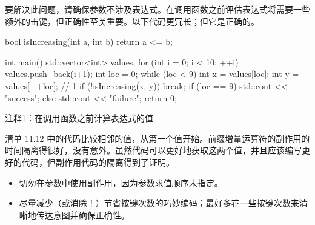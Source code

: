 要解决此问题，请确保参数不涉及表达式。在调用函数之前评估表达式将需要一些额外的击键，但正确性至关重要。以下代码更冗长；但它是正确的。


\begin{cpp}
bool isIncreasing(int a, int b) {
  return a <= b;
}

int main() {
  std::vector<int> values;
  for (int i = 0; i < 10; ++i)
    values.push_back(i+1);
  int loc = 0;
  while (loc < 9) {
    int x = values[loc];
    int y = values[++loc]; // 1
    if (!isIncreasing(x, y))
      break;
  }
  if (loc == 9)
    std::cout << "success\n";
  else
    std::cout << "failure\n";
  return 0;
}
\end{cpp}

{\footnotesize
注释1：在调用函数之前计算表达式的值
}

清单 11.12 中的代码比较相邻的值，从第一个值开始。前缀增量运算符的副作用的时间隔离得很好，没有意外。虽然代码可以更好地获取这两个值，并且应该编写更好的代码，但副作用代码的隔离得到了证明。


\begin{itemize}
\item
切勿在参数中使用副作用，因为参数求值顺序未指定。

\item
尽量减少（或消除！）节省按键次数的巧妙编码；最好多花一些按键次数来清晰地传达意图并确保正确性。
\end{itemize}





